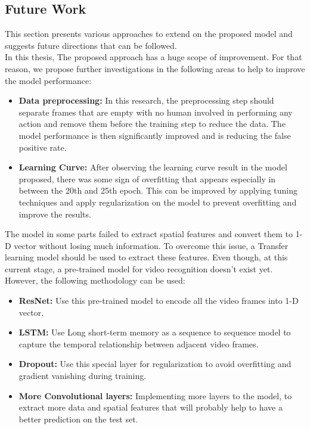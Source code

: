 \subsection{Future Work}
\hspace{5mm} This section presents various approaches to extend on the proposed model and suggests future directions that can be followed.\\
In this thesis, The proposed approach has a huge scope of improvement. For that reason, we propose further investigations in the following areas to help to improve the model performance:
\begin{itemize}
    \item \textbf{Data preprocessing:} In this research, the preprocessing step should separate frames that are empty with no human involved in performing any action and remove them before the training step to reduce the data. The model performance is then significantly improved and is reducing the false positive rate.
    \item \textbf{Learning Curve:} After observing the learning curve result in the model proposed, there was some sign of overfitting that appears especially in between the 20th and 25th epoch. This can be improved by applying tuning techniques and apply regularization on the model to prevent overfitting and improve the results.
    
\end{itemize}
\hspace{5mm} The model in some parts failed to extract spatial features and convert them to 1-D vector without losing much information. To overcome this issue, a Transfer learning model should be used to extract these features. Even though, at this current stage, a pre-trained model for video recognition doesn’t exist yet. However, the following methodology can be used:
\begin{itemize}
    \item \textbf{ResNet:} Use this pre-trained model to encode all the video frames into 1-D vector.
    \item \textbf{LSTM:} Use Long short-term memory as a sequence to sequence model to capture the temporal relationship between adjacent video frames.
    \item \textbf{Dropout:} Use this special layer for regularization to avoid overfitting and gradient vanishing during training.
    \item \textbf{More Convolutional layers:} Implementing more layers to the model, to extract more data and spatial features that will probably help to have a better prediction on the test set.
\end{itemize}

